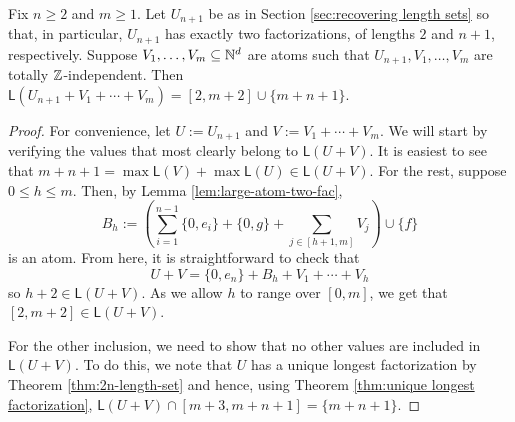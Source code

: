 \begin{cor} \label{thm:int-point-construction}
Fix $n\ge 2$ and $m\ge 1$.  
Let $U_{n+1}$ be as in Section \ref{sec:recovering length sets} so that, in particular, $U_{n+1}$ has exactly two factorizations, of lengths $2$ and $n+1$, respectively.  
Suppose $V_1,\dots, V_m \subseteq \mathbb{N}^d$ are atoms such that $U_{n+1},V_1,\dots, V_m$ are totally $\mathbb{Z}$-independent.
Then $\mathsf{L}(U_{n+1}+V_1+\cdots+V_m) = [ 2,m+2 ] \cup \{m+n+1\}$.
\end{cor}

\begin{proof}
For convenience, let $U := U_{n+1}$ and $V := V_1 + \cdots + V_m$.
We will start by verifying the values that most clearly belong to $\mathsf{L}(U+V)$.
It is easiest to see that $m+n+1 =\max\mathsf{L}(V)+\max\mathsf{L}(U) \in \mathsf{L}(U+V)$.
For the rest, suppose $0\le h \le m$.
Then, by Lemma \ref{lem:large-atom-two-fac}, 
\[B_h := \left( \sum_{i=1}^{n-1} \{0,e_i\} + \{0,g\} + \sum_{j\in [ h+1,m ]} V_j \right) \cup \{f\} \]
is an atom.
From here, it is straightforward to check that
\[ U+ V = \{0,e_n\} + B_h + V_1 + \cdots + V_h \]
so $h+2 \in \mathsf{L}(U+V)$.
As we allow $h$ to range over $[ 0,m ]$, we get that $[ 2,m+2 ] \in \mathsf{L}(U+V)$.

For the other inclusion, we need to show that no other values are included in $\mathsf{L}(U+V)$.
To do this, we note that $U$ has a unique longest factorization by Theorem \ref{thm:2n-length-set} and hence, using Theorem \ref{thm:unique longest factorization}, $\mathsf{L}(U+V) \cap [ m+3, m+n+1 ] = \{m+n+1\}$.
\end{proof}



